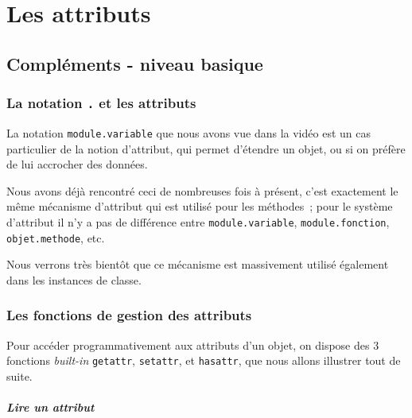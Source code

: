    
    
    
    

    

    \hypertarget{les-attributs}{%
\section{Les attributs}\label{les-attributs}}

    \hypertarget{compluxe9ments---niveau-basique}{%
\subsection{Compléments - niveau
basique}\label{compluxe9ments---niveau-basique}}

    \hypertarget{la-notation-.-et-les-attributs}{%
\subsubsection{\texorpdfstring{La notation \texttt{.} et les
attributs}{La notation . et les attributs}}\label{la-notation-.-et-les-attributs}}

    La notation \texttt{module.variable} que nous avons vue dans la vidéo
est un cas particulier de la notion d'attribut, qui permet d'étendre un
objet, ou si on préfère de lui accrocher des données.

Nous avons déjà rencontré ceci de nombreuses fois à présent, c'est
exactement le même mécanisme d'attribut qui est utilisé pour les
méthodes~; pour le système d'attribut il n'y a pas de différence entre
\texttt{module.variable}, \texttt{module.fonction},
\texttt{objet.methode}, etc.

Nous verrons très bientôt que ce mécanisme est massivement utilisé
également dans les instances de classe.

    \hypertarget{les-fonctions-de-gestion-des-attributs}{%
\subsubsection{Les fonctions de gestion des
attributs}\label{les-fonctions-de-gestion-des-attributs}}

    Pour accéder programmativement aux attributs d'un objet, on dispose des
3 fonctions \emph{built-in} \texttt{getattr}, \texttt{setattr}, et
\texttt{hasattr}, que nous allons illustrer tout de suite.

    \hypertarget{lire-un-attribut}{%
\subparagraph{Lire un attribut}\label{lire-un-attribut}}

